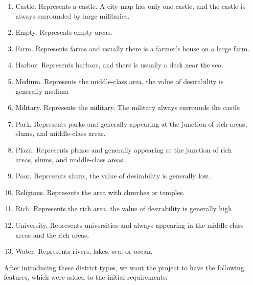 \begin{enumerate}
  \item Castle. Represents a castle. A city map has only one castle, and the castle is always surrounded by large militaries.
  \item Empty. Represents empty areas.
  \item Farm. Represents farms and usually there is a farmer’s house on a large farm.
  \item Harbor. Represents harbors, and there is usually a deck near the sea.
  \item Medium. Represents the middle-class area, the value of desirability is generally medium
  \item Military. Represents the military. The military always surrounds the castle
  \item Park. Represents parks and generally appearing at the junction of rich areas,  slums, and middle-class areas.
  \item Plaza. Represents plazas and generally appearing at the junction of rich areas,  slums, and middle-class areas.
  \item Poor. Represents slums, the value of desirability is generally low.
  \item Religious. Represents the area with churches or temples.
  \item Rich. Represents the rich area, the value of desirability is generally high
  \item University. Represents universities and always appearing in the middle-class areas and the rich areas.
  \item Water. Represents rivers, lakes, sea, or ocean.
\end{enumerate}

After introducing these district types, we want the project to have the following features, which were added to the initial requirements:

